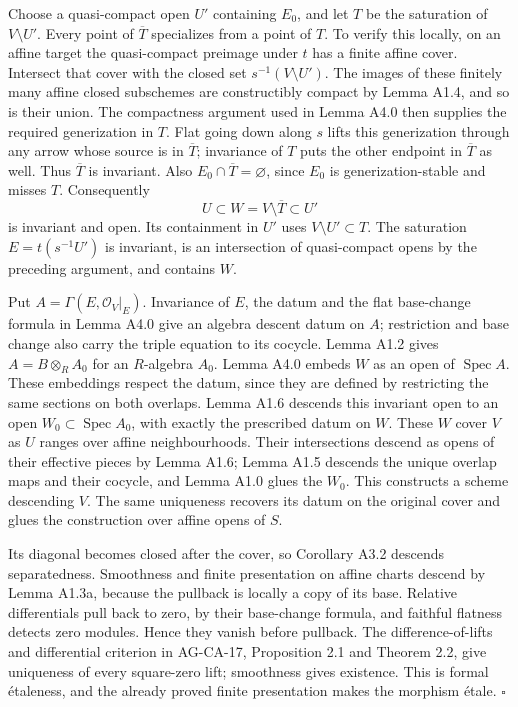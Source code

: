 \documentclass[11pt,a4paper,openany]{report}
\begin{document}
Choose a quasi-compact open \(U'\) containing \(E_0\), and let \(T\) be the saturation of \(V\setminus U'\). Every point of \(\overline T\) specializes from a point of \(T\). To verify this locally, on an affine target the quasi-compact preimage under \(t\) has a finite affine cover. Intersect that cover with the closed set \(s^{-1}(V\setminus U')\). The images of these finitely many affine closed subschemes are constructibly compact by Lemma A1.4, and so is their union. The compactness argument used in Lemma A4.0 then supplies the required generization in \(T\). Flat going down along \(s\) lifts this generization through any arrow whose source is in \(\overline T\); invariance of \(T\) puts the other endpoint in \(\overline T\) as well. Thus \(\overline T\) is invariant. Also \(E_0\cap\overline T=\varnothing\), since \(E_0\) is generization-stable and misses \(T\). Consequently \[
U\subset W=V\setminus\overline T\subset U'
\] is invariant and open. Its containment in \(U'\) uses \(V\setminus U'\subset T\). The saturation \(E=t(s^{-1}U')\) is invariant, is an intersection of quasi-compact opens by the preceding argument, and contains \(W\).

Put \(A=\Gamma(E,\mathcal O_V|_E)\). Invariance of \(E\), the datum and the flat base-change formula in Lemma A4.0 give an algebra descent datum on \(A\); restriction and base change also carry the triple equation to its cocycle. Lemma A1.2 gives \(A=B\otimes_R A_0\) for an \(R\)-algebra \(A_0\). Lemma A4.0 embeds \(W\) as an open of \(\operatorname{Spec}A\). These embeddings respect the datum, since they are defined by restricting the same sections on both overlaps. Lemma A1.6 descends this invariant open to an open \(W_0\subset\operatorname{Spec}A_0\), with exactly the prescribed datum on \(W\). These \(W\) cover \(V\) as \(U\) ranges over affine neighbourhoods. Their intersections descend as opens of their effective pieces by Lemma A1.6; Lemma A1.5 descends the unique overlap maps and their cocycle, and Lemma A1.0 glues the \(W_0\). This constructs a scheme descending \(V\). The same uniqueness recovers its datum on the original cover and glues the construction over affine opens of \(S\).

Its diagonal becomes closed after the cover, so Corollary A3.2 descends separatedness. Smoothness and finite presentation on affine charts descend by Lemma A1.3a, because the pullback is locally a copy of its base. Relative differentials pull back to zero, by their base-change formula, and faithful flatness detects zero modules. Hence they vanish before pullback. The difference-of-lifts and differential criterion in AG-CA-17, Proposition 2.1 and Theorem 2.2, give uniqueness of every square-zero lift; smoothness gives existence. This is formal étaleness, and the already proved finite presentation makes the morphism étale. \(\square\)
\end{document}
